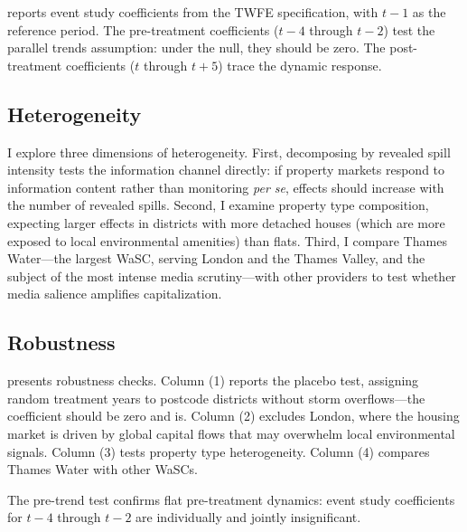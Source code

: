 \documentclass[12pt]{article}
\begin{document}


 reports event study coefficients from the TWFE specification, with $t-1$ as the reference period. The pre-treatment coefficients ($t-4$ through $t-2$) test the parallel trends assumption: under the null, they should be zero. The post-treatment coefficients ($t$ through $t+5$) trace the dynamic response.

\subsection{Heterogeneity}

I explore three dimensions of heterogeneity. First, decomposing by revealed spill intensity tests the information channel directly: if property markets respond to information content rather than monitoring \textit{per se}, effects should increase with the number of revealed spills. Second, I examine property type composition, expecting larger effects in districts with more detached houses (which are more exposed to local environmental amenities) than flats. Third, I compare Thames Water---the largest WaSC, serving London and the Thames Valley, and the subject of the most intense media scrutiny---with other providers to test whether media salience amplifies capitalization.

\subsection{Robustness}



 presents robustness checks. Column (1) reports the placebo test, assigning random treatment years to postcode districts without storm overflows---the coefficient should be zero and is. Column (2) excludes London, where the housing market is driven by global capital flows that may overwhelm local environmental signals. Column (3) tests property type heterogeneity. Column (4) compares Thames Water with other WaSCs.

The pre-trend test confirms flat pre-treatment dynamics: event study coefficients for $t-4$ through $t-2$ are individually and jointly insignificant.
\end{document}

